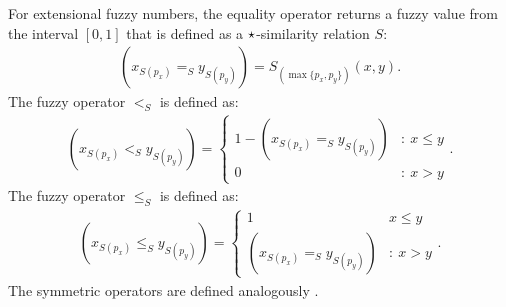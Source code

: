\documentclass{amcs}
\newcommand{\procedura}[1]{\textsc{#1}}
\newcommand{\relS}{S}
\newcommand{\lS}{<_\relS}
\newcommand{\leqslantS}{\leqslant_\relS}
\newcommand{\eqS}{=_\relS}
\newcommand{\efn}{extensional fuzzy number}
\begin{document}
For \efn s, the equality operator returns a fuzzy value from the interval $[0,1]$ that is defined as a $\operatorname*{\star}$-similarity relation $S$:
\begin{align}
	\left(x_{\relS(p_x)} \eqS y_{\relS(p_y)}\right) = \relS_{\left(\max\{p_x, p_y\}\right)}(x,y).
	\label{eq:eqS}
\end{align}
%
The fuzzy operator $\lS$ is defined as:
\begin{align}
	\left(x_{\relS(p_{x})} \lS y_{\relS(p_{y})}\right) = 
   \begin{cases}
      1 -  \left(x_{\relS(p_{x})} \eqS y_{\relS(p_{y})}\right) & : \  x \leqslant y \\
      0 & : \ x > y
   \end{cases}.
   \label{eq:lS}
\end{align}
The fuzzy operator $\leqslantS$ is defined as:
\begin{align}
	\left(x_{\relS(p_{x})} \leqslantS y_{\relS(p_{y})}\right) = 
	\begin{cases}
		1 & x \leqslant y \\
		\left(x_{\relS(p_{x})} \eqS y_{\relS(p_{y})}\right) & : \  x > y 		
	\end{cases}.
	\label{eq:leqslantS}
\end{align}
The symmetric operators are defined analogously \cite{id:Siminski2026Arithmetic}.

 

%
%
%
%
%
%
%
%
\end{document}
